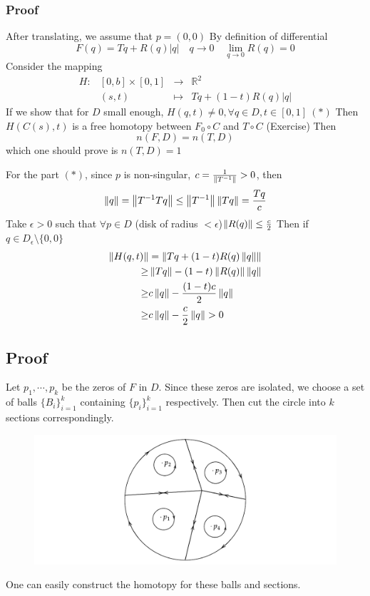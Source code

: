 \documentclass{book}
\newcommand{\abs}[1]{\left\lvert #1 \right\rvert}
\begin{document}
\subsubsection*{Proof}
After translating, we assume that $p=(0,0)$ By definition of differential
$$F(q)=Tq+R(q)\abs q\quad q\rightarrow 0\quad\lim\limits_{q\rightarrow 0}R(q)=0$$
Consider the mapping
$$\begin{aligned}
    H:&[0,b]\times[0,1]&\rightarrow&\mathbb{R}^2\\
    &(s,t)&\mapsto&Tq+(1-t)R(q)\abs q
\end{aligned}$$
If we show that for $D$ small enough, $H(q,t)\neq 0, \forall q\in D,t\in [0,1]\ (*)$ Then $H(C(s),t)$ is a free homotopy between $F_0\circ C$ and $T\circ C$ (Exercise) Then $$n(F,D)=n(T,D)$$
which one should prove is $n(T,D)=1$

For the part $(*)$, since $p$ is non-singular, $c=\frac{1}{\left\lVert T^{-1} \right\rVert}>0$, then 
$$\left\lVert q \right\rVert=\left\lVert  T^{-1}T q \right\rVert\leq\left\lVert T^{-1} \right\rVert\left\lVert Tq \right\rVert=\frac{Tq}c$$
Take $\epsilon>0$ such that $\forall p\in D$ (disk of radius $<\epsilon$)$\left\lVert R(q) \right\rVert\leq\frac{c}2$ Then if $q\in D_\epsilon\setminus\{0,0\}$
$$\begin{aligned}
    \left\lVert H(q,t) \right\rVert&=\left\lVert Tq+(1-t)R(q)\left\lVert q \right\rVert \right\rVert\\
    \geq&\left\lVert Tq \right\rVert-(1-t)\left\lVert R(q) \right\rVert\left\lVert q \right\rVert\\
    \geq&c\left\lVert q \right\rVert-\frac{(1-t)c}2\left\lVert q \right\rVert\\
    \geq&c\left\lVert q \right\rVert-\frac{c}2\left\lVert q \right\rVert>0 
\end{aligned}$$\newpage
\subsection*{Proof}
Let $p_1,\cdots,p_k$ be the zeros of $F$ in $D$. Since these zeros are isolated, we choose a set of balls $\{B_i\}_{i=1}^k$ containing $\{p_i\}_{i=1}^k$ respectively. Then cut the circle into $k$ sections correspondingly.

\begin{figure}[!h]
    \centering
    \includegraphics[width=\textwidth]{img/3.pdf}
\end{figure}
One can easily construct the homotopy for these balls and sections.
\end{document}
